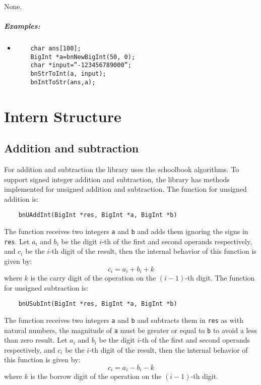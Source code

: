 \documentclass{book}
\begin{document}
None.

\paragraph{Examples:}

\begin{itemize}
\item

\begin{verbatim}
	char ans[100];
	BigInt *a=bnNewBigInt(50, 0);
	char *input=”-123456789000”;
	bnStrToInt(a, input);
	bnIntToStr(ans,a);
\end{verbatim}
\end{itemize}


\chapter{Intern Structure}

\section{Addition and subtraction}
For addition and subtraction the library uses the schoolbook algorithms. To support signed integer addition and subtraction, the library has methods implemented for unsigned addition and subtraction. The function for unsigned addition is:
    \begin{verbatim}
    bnUAddInt(BigInt *res, BigInt *a, BigInt *b)
    \end{verbatim}
The function receives two integers \verb+a+ and \verb+b+ and adds them ignoring the signs in \verb+res+. Let $a_i$ and $b_i$ be the digit $i$-th of the first and second operands respectively, and $c_i$ be the $i$-th digit of the result, then the internal behavior of this function is given by:
\[c_i = a_i + b_i + k \]
where $k$ is the carry digit of the operation on the $(i-1)$-th digit. The function for unsigned subtraction is:
    \begin{verbatim}
    bnUSubInt(BigInt *res, BigInt *a, BigInt *b)
    \end{verbatim}
The function receives two integers \verb+a+ and \verb+b+ and subtracts them in \verb+res+ as with natural numbers, the magnitude of \verb+a+ must be greater or equal to \verb+b+ to avoid a less than zero result. Let $a_i$ and $b_i$ be the digit $i$-th of the first and second operands respectively, and $c_i$ be the $i$-th digit of the result, then the internal behavior of this function is given by:
\[c_i = a_i - b_i - k \]
where $k$ is the borrow digit of the operation on the $(i-1)$-th digit. \\
\end{document}
